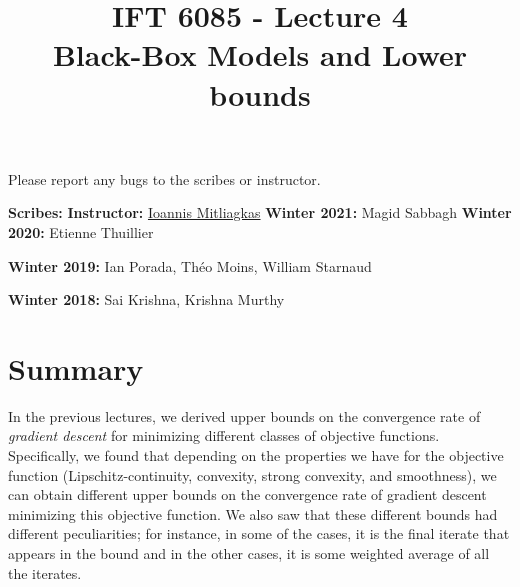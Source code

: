 \documentclass{article}
\title{IFT 6085 - Lecture 4 \\ 
Black-Box Models and Lower bounds }
\date{}
\begin{document}
 

\maketitle

\vspace{-0.5in}
\begin{center}
Please report any bugs to the scribes or instructor.
\end{center}
\vspace{0.2in}

\textbf{Scribes:}
\hfill
\textbf{Instructor:} {\href{https://mitliagkas.github.io/}{Ioannis Mitliagkas}}
\textbf{Winter 2021:} Magid Sabbagh
\textbf{Winter 2020:} Etienne Thuillier

\textbf{Winter 2019:} Ian Porada, Th\'eo Moins, William Starnaud 

\textbf{Winter 2018:} Sai Krishna, Krishna Murthy 



\newcommand{\infgc}{\inf_{g \in \mathcal{C}}}
\newcommand{\supgc}{\sup_{g \in \mathcal{C}}}

\newcommand{\Prob}{\mathbb{P}}
\newcommand{\E}{\mathbb{E}}
\newcommand{\reals}{\mathbb{R}}


\section{Summary}

In the previous lectures, we derived upper bounds on the convergence rate of \emph{gradient descent} for minimizing different classes of objective functions.
Specifically, we found that depending on the properties we have for the objective function (Lipschitz-continuity, convexity, strong convexity, and smoothness), we can obtain different upper bounds on the convergence rate of gradient descent minimizing this objective function. 
We also saw that these different bounds had different peculiarities; for instance, in some of the cases, it is the final iterate that appears in the bound and in the other cases, it is some weighted average of all the iterates. \\
\end{document}
